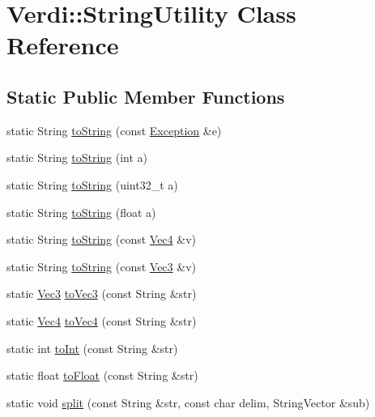 \hypertarget{class_verdi_1_1_string_utility}{\section{\-Verdi\-:\-:\-String\-Utility \-Class \-Reference}
\label{class_verdi_1_1_string_utility}
}
\subsection*{\-Static \-Public \-Member \-Functions}
\begin{DoxyCompactItemize}
\item 
static \-String \hyperlink{class_verdi_1_1_string_utility_a05f721fe8285c9cffcbf016b67571504}{to\-String} (const \hyperlink{class_verdi_1_1_exception}{\-Exception} \&e)
\item 
static \-String \hyperlink{class_verdi_1_1_string_utility_ad0ff47e98ea87cfa80293c64ca9a467e}{to\-String} (int a)
\item 
static \-String \hyperlink{class_verdi_1_1_string_utility_aed03f126ee802fc9eb44d24ac5a6b1cb}{to\-String} (uint32\-\_\-t a)
\item 
static \-String \hyperlink{class_verdi_1_1_string_utility_a2e36f17819e6f5aabe298cf48fedab0f}{to\-String} (float a)
\item 
static \-String \hyperlink{class_verdi_1_1_string_utility_ad83ef6e181c9282a41341cd15692bdb0}{to\-String} (const \hyperlink{class_verdi_1_1_vec4}{\-Vec4} \&v)
\item 
static \-String \hyperlink{class_verdi_1_1_string_utility_a6b4417360686e73e5ce7d1454a01ce1f}{to\-String} (const \hyperlink{class_verdi_1_1_vec3}{\-Vec3} \&v)
\item 
static \hyperlink{class_verdi_1_1_vec3}{\-Vec3} \hyperlink{class_verdi_1_1_string_utility_a88860de728053bb99e168095e1d20acc}{to\-Vec3} (const \-String \&str)
\item 
static \hyperlink{class_verdi_1_1_vec4}{\-Vec4} \hyperlink{class_verdi_1_1_string_utility_a865b5a97bcde0bc119984642b15e2fff}{to\-Vec4} (const \-String \&str)
\item 
static int \hyperlink{class_verdi_1_1_string_utility_a4ab357f749ea078b9c7c782839c5d850}{to\-Int} (const \-String \&str)
\item 
static float \hyperlink{class_verdi_1_1_string_utility_ab87e0bb657aed2b0227b5a2999c5229b}{to\-Float} (const \-String \&str)
\item 
static void \hyperlink{class_verdi_1_1_string_utility_a4c000a02048d1fdbf09ff2339f4ccaab}{split} (const \-String \&str, const char delim, \-String\-Vector \&sub)
\end{DoxyCompactItemize}


